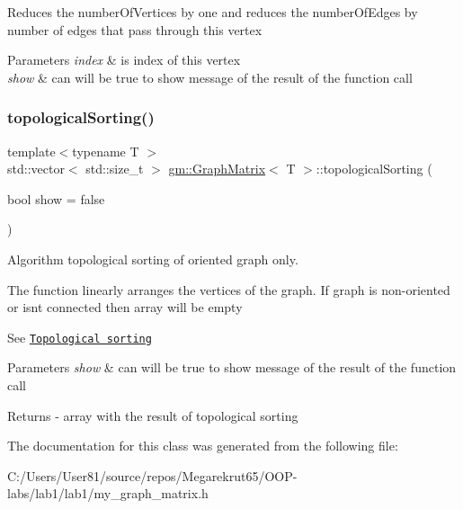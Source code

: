 Reduces the \textquotesingle{}number\+Of\+Vertices\textquotesingle{} by one and reduces the \textquotesingle{}number\+Of\+Edges\textquotesingle{} by number of edges that pass through this vertex 
\begin{DoxyParams}{Parameters}
{\em index} & is index of this vertex \\
\hline
{\em show} & can will be true to show message of the result of the function call \\
\hline
\end{DoxyParams}
\mbox{\label{classgm_1_1_graph_matrix_a8f88b6ebce9cc1ed403d414cd173da02}} 
\subsubsection{\texorpdfstring{topological\+Sorting()}{topologicalSorting()}}
{\footnotesize\ttfamily template$<$typename T $>$ \\
std\+::vector$<$ std\+::size\+\_\+t $>$ \mbox{\hyperlink{classgm_1_1_graph_matrix}{gm\+::\+Graph\+Matrix}}$<$ T $>$\+::topological\+Sorting (\begin{DoxyParamCaption}\item[{bool}]{show = {\ttfamily false} }\end{DoxyParamCaption})}



Algorithm topological sorting of oriented graph only. 

The function linearly arranges the vertices of the graph. If graph is non-\/oriented or isn\textquotesingle{}t connected then array will be empty

See \href{https://en.wikipedia.org/wiki/Topological_sorting}{\tt Topological sorting} 
\begin{DoxyParams}{Parameters}
{\em show} & can will be true to show message of the result of the function call \\
\hline
\end{DoxyParams}
\begin{DoxyReturn}{Returns}
-\/ array with the result of topological sorting 
\end{DoxyReturn}


The documentation for this class was generated from the following file\+:\begin{DoxyCompactItemize}
\item 
C\+:/\+Users/\+User81/source/repos/\+Megarekrut65/\+O\+O\+P-\/labs/lab1/lab1/my\+\_\+graph\+\_\+matrix.\+h\end{DoxyCompactItemize}
